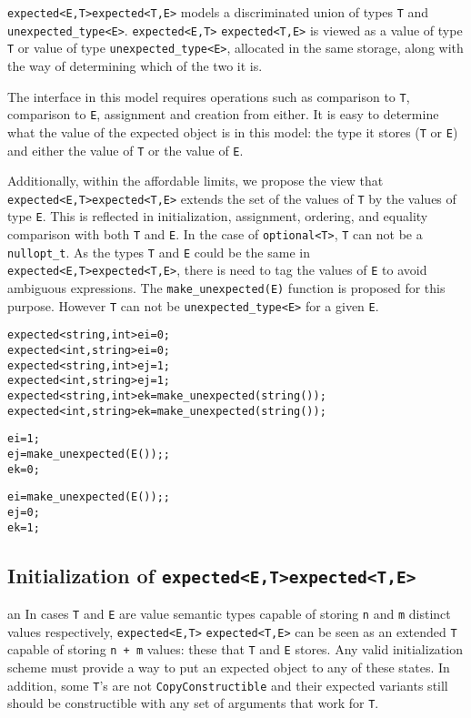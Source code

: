 \documentclass[a4paper,10pt]{article}
\newcommand{\cpp}[1]{\lstinline{#1}}
\newcommand{\suppress}[1]{\colorbox{suppress_color}{#1}}
\newcommand{\update}[1]{\colorbox{update_color}{#1}}
\begin{document}
\suppress{\cpp{expected<E,T>}}\update{\cpp{expected<T,E>}} models a discriminated union of types \cpp{T} and \cpp{unexpected_type<E>}. \suppress{\cpp{expected<E,T>}} \update{\cpp{expected<T,E>}} is viewed as a value of type \cpp{T} or value of type \cpp{unexpected_type<E>}, allocated in the same storage, along with the way of determining which of the two it is. 

The interface in this model requires operations such as comparison to \cpp{T}, comparison to \cpp{E}, assignment and creation from either. It is easy to determine what the value of the expected object is in this model: the type it stores (\cpp{T} or \cpp{E}) and either the value of \cpp{T} or the value of \cpp{E}. 

Additionally, within the affordable limits, we propose the view that \suppress{\cpp{expected<E,T>}}\update{\cpp{expected<T,E>}} extends the set of the values of \cpp{T} by the values of type \cpp{E}. This is reflected in initialization, assignment, ordering, and equality comparison with both \cpp{T} and \cpp{E}. In the case of  \cpp{optional<T>}, \cpp{T} can not be a \cpp{nullopt_t}. As the types \cpp{T} and \cpp{E} could be the same in \suppress{\cpp{expected<E,T>}}\update{\cpp{expected<T,E>}}, there is need to tag the values of \cpp{E} to avoid ambiguous expressions. The \cpp{make_unexpected(E)} function is proposed for this purpose. However \cpp{T} can not be  \cpp{unexpected_type<E>} for a given \cpp{E}.

\begin{alltt}
\suppress{expected<string, int> ei = 0;}
\update{expected<int, string> ei = 0;}
\suppress{expected<string, int> ej = 1;}
\update{expected<int, string> ej = 1;}
\suppress{expected<string, int> ek = make_unexpected(string());}
\update{expected<int, string> ek = make_unexpected(string());}

ei = 1;
ej = make_unexpected(E());;
ek = 0;

ei = make_unexpected(E());;
ej = 0;
ek = 1;
\end{alltt}

\subsection{Initialization of \suppress{\cpp{expected<E,T>}}\update{\cpp{expected<T,E>}}}
an
In cases \cpp{T} and \cpp{E} are value semantic types capable of storing \cpp{n} and \cpp{m} distinct values respectively, \suppress{\cpp{expected<E,T>}} \update{\cpp{expected<T,E>}} can be seen as an extended \cpp{T} capable of storing \cpp{n + m} values: these that \cpp{T} and \cpp{E} stores. Any valid initialization scheme must provide a way to put an expected object to any of these states. In addition, some \cpp{T}'s  are not \cpp{CopyConstructible} and their expected variants still should be constructible with any set of arguments that work for \cpp{T}.
\end{document}
